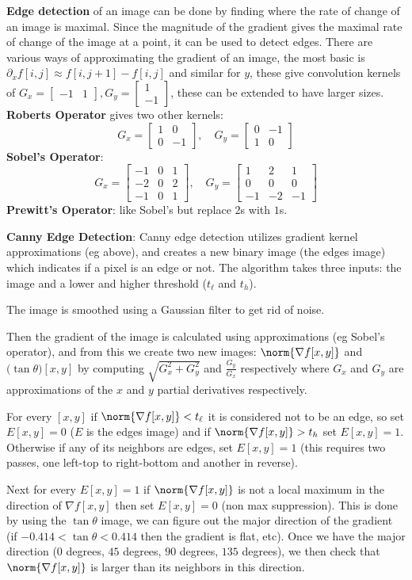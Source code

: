 \documentclass[10pt, twocolumn]{article}
\let\bold=\textbf
\def\bmat#1{\begin{bmatrix}#1\end{bmatrix}}
\begin{document}
\bold{Edge detection} of an image can be done by finding where the rate of change of an image is maximal.
Since the magnitude of the gradient gives the maximal rate of change of the image at a point, it can be used to detect edges.
There are various ways of approximating the gradient of an image, the most basic is $\partial_x f[i,j]\approx f[i,j+1]-f[i,j]$ and similar for $y$, these give convolution kernels of
$G_x=\bmat{-1 & 1}, G_y=\bmat{1\\-1}$, these can be extended to have larger sizes.
\bold{Roberts Operator} gives two other kernels:
$$ G_x = \bmat{1 & 0 \\ 0 & -1},\quad G_y = \bmat{0 & -1 \\ 1 & 0} $$
\bold{Sobel's Operator}:
$$ G_x = \bmat{-1 & 0 & 1 \\ -2 & 0 & 2 \\ -1 & 0 & 1},\quad G_y = \bmat{1 & 2 & 1\\ 0 & 0 & 0 \\ -1 & -2 & -1} $$ 
\bold{Prewitt's Operator}: like Sobel's but replace $2$s with $1$s.

\bold{Canny Edge Detection}: Canny edge detection utilizes gradient kernel approximations (eg above), and creates a new binary image (the edges image) which indicates if a pixel is an edge or not.
The algorithm takes three inputs: the image and a lower and higher threshold ($t_\ell$ and $t_h$).
\benum
    \item The image is smoothed using a Gaussian filter to get rid of noise.
    \item Then the gradient of the image is calculated using approximations (eg Sobel's operator), and from this we create two new images: $\norm{\nabla f[x,y]}$ and $\bigl(\tan\theta\bigr)[x,y]$ by
computing $\sqrt{G_x^2+G_y^2}$ and $\frac{G_y}{G_x}$ respectively where $G_x$ and $G_y$ are approximations of the $x$ and $y$ partial derivatives respectively.
    \item For every $[x,y]$ if $\norm{\nabla f[x,y]}<t_\ell$ it is considered not to be an edge, so set $E[x,y]=0$ ($E$ is the edges image) and if $\norm{\nabla f[x,y]}>t_h$ set $E[x,y]=1$.
            Otherwise if any of its neighbors are edges, set $E[x,y]=1$ (this requires two passes, one left-top to right-bottom and another in reverse).
    \item Next for every $E[x,y]=1$ if $\norm{\nabla f[x,y]}$ is not a local maximum in the direction of $\nabla f[x,y]$ then set $E[x,y]=0$ (non max suppression).
            This is done by using the $\tan\theta$ image, we can figure out the major direction of the gradient (if $-0.414<\tan\theta<0.414$ then the gradient is flat, etc).
            Once we have the major direction ($0$ degrees, $45$ degrees, $90$ degrees, $135$ degrees), we then check that $\norm{\nabla f[x,y]}$ is larger than its neighbors in this direction.
\eenum
\end{document}
